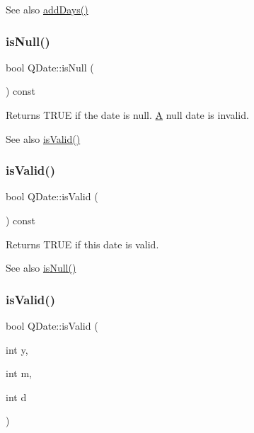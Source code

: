\begin{DoxySeeAlso}{See also}
\mbox{\hyperlink{class_q_date_aea0944d5825cb73f4bdad70577ba9a31}{add\+Days()}} 
\end{DoxySeeAlso}
\mbox{\label{class_q_date_a68f2787f407fd6812712b34c11f9bfb8}} 
\subsubsection{\texorpdfstring{isNull()}{isNull()}}
{\footnotesize\ttfamily bool Q\+Date\+::is\+Null (\begin{DoxyParamCaption}{ }\end{DoxyParamCaption}) const\hspace{0.3cm}{\ttfamily [inline]}}

Returns T\+R\+UE if the date is null. \mbox{\hyperlink{class_a}{A}} null date is invalid.

\begin{DoxySeeAlso}{See also}
\mbox{\hyperlink{class_q_date_a29baa5808185ed5a3ed5a0440e27ca9c}{is\+Valid()}} 
\end{DoxySeeAlso}
\mbox{\label{class_q_date_a29baa5808185ed5a3ed5a0440e27ca9c}} 
\subsubsection{\texorpdfstring{isValid()}{isValid()}\hspace{0.1cm}{\footnotesize\ttfamily [1/2]}}
{\footnotesize\ttfamily bool Q\+Date\+::is\+Valid (\begin{DoxyParamCaption}{ }\end{DoxyParamCaption}) const}

Returns T\+R\+UE if this date is valid.

\begin{DoxySeeAlso}{See also}
\mbox{\hyperlink{class_q_date_a68f2787f407fd6812712b34c11f9bfb8}{is\+Null()}} 
\end{DoxySeeAlso}
\mbox{\label{class_q_date_a837d8f55470c8d8fe41efe980b68ee86}} 
\subsubsection{\texorpdfstring{isValid()}{isValid()}\hspace{0.1cm}{\footnotesize\ttfamily [2/2]}}
{\footnotesize\ttfamily bool Q\+Date\+::is\+Valid (\begin{DoxyParamCaption}\item[{int}]{y,  }\item[{int}]{m,  }\item[{int}]{d }\end{DoxyParamCaption})\hspace{0.3cm}{\ttfamily [static]}}

